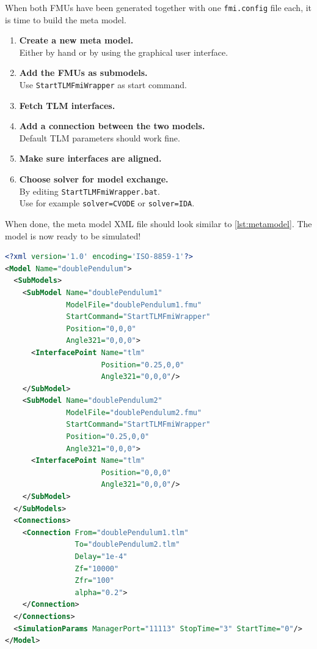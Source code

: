 \documentclass[11pt,a4paper]{report}
\begin{document}
When both FMUs have been generated together with one \texttt{fmi.config} file each, it is time to build the meta model.
\begin{enumerate}
\item \textbf{Create a new meta model.}\\
             Either by hand or by using the graphical user interface.
\item \textbf{Add the FMUs as submodels.}\\
              Use \texttt{StartTLMFmiWrapper} as start command.
\item \textbf{Fetch TLM interfaces.}
\item \textbf{Add a connection between the two models.}\\
              Default TLM parameters should work fine.
\item \textbf{Make sure interfaces are aligned.}
\item \textbf{Choose solver for model exchange.}\\
              By editing \texttt{StartTLMFmiWrapper.bat}.\\
              Use for example \texttt{solver=CVODE} or \texttt{solver=IDA}.
\end{enumerate}

When done, the meta model XML file should look similar to \cref{lst:metamodel}.
The model is now ready to be simulated!

\begin{lstlisting}[language=xml,float,floatplacement=ht,label={lst:metamodel},caption=XML description of the complete meta model]
<?xml version='1.0' encoding='ISO-8859-1'?>
<Model Name="doublePendulum">
  <SubModels>
    <SubModel Name="doublePendulum1" 
              ModelFile="doublePendulum1.fmu"
              StartCommand="StartTLMFmiWrapper" 
              Position="0,0,0" 
              Angle321="0,0,0">
      <InterfacePoint Name="tlm" 
                      Position="0.25,0,0" 
                      Angle321="0,0,0"/>
    </SubModel>
    <SubModel Name="doublePendulum2" 
              ModelFile="doublePendulum2.fmu" 
              StartCommand="StartTLMFmiWrapper" 
              Position="0.25,0,0"  
              Angle321="0,0,0">
      <InterfacePoint Name="tlm" 
                      Position="0,0,0" 
                      Angle321="0,0,0"/>
    </SubModel>
  </SubModels>
  <Connections>
    <Connection From="doublePendulum1.tlm" 
                To="doublePendulum2.tlm" 
                Delay="1e-4" 
                Zf="10000"   
                Zfr="100"
                alpha="0.2">
    </Connection>
  </Connections>
  <SimulationParams ManagerPort="11113" StopTime="3" StartTime="0"/>
</Model>
\end{lstlisting}




\end{document}
